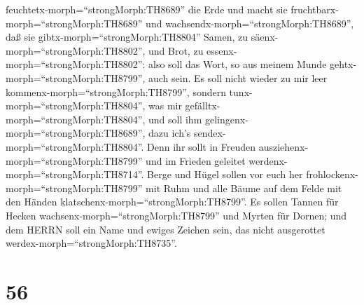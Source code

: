 feuchtetx-morph=``strongMorph:TH8689'' die Erde und macht sie
fruchtbarx-morph=``strongMorph:TH8689'' und
wachsendx-morph=``strongMorph:TH8689'', daß sie
gibtx-morph=``strongMorph:TH8804'' Samen, zu
säenx-morph=``strongMorph:TH8802'', und Brot, zu
essenx-morph=``strongMorph:TH8802'':  also soll das Wort,
so aus meinem Munde gehtx-morph=``strongMorph:TH8799'', auch sein. Es
soll nicht wieder zu mir leer kommenx-morph=``strongMorph:TH8799'',
sondern tunx-morph=``strongMorph:TH8804'', was mir
gefälltx-morph=``strongMorph:TH8804'', und soll ihm
gelingenx-morph=``strongMorph:TH8689'', dazu ich's
sendex-morph=``strongMorph:TH8804''.  Denn ihr sollt in
Freuden ausziehenx-morph=``strongMorph:TH8799'' und im Frieden geleitet
werdenx-morph=``strongMorph:TH8714''. Berge und Hügel sollen vor euch
her frohlockenx-morph=``strongMorph:TH8799'' mit Ruhm und alle Bäume auf
dem Felde mit den Händen klatschenx-morph=``strongMorph:TH8799''.
 Es sollen Tannen für Hecken
wachsenx-morph=``strongMorph:TH8799'' und Myrten für Dornen; und dem
HERRN soll ein Name und ewiges Zeichen sein, das nicht ausgerottet
werdex-morph=``strongMorph:TH8735''.

\hypertarget{section-55}{%
\section{56}\label{section-55}}

